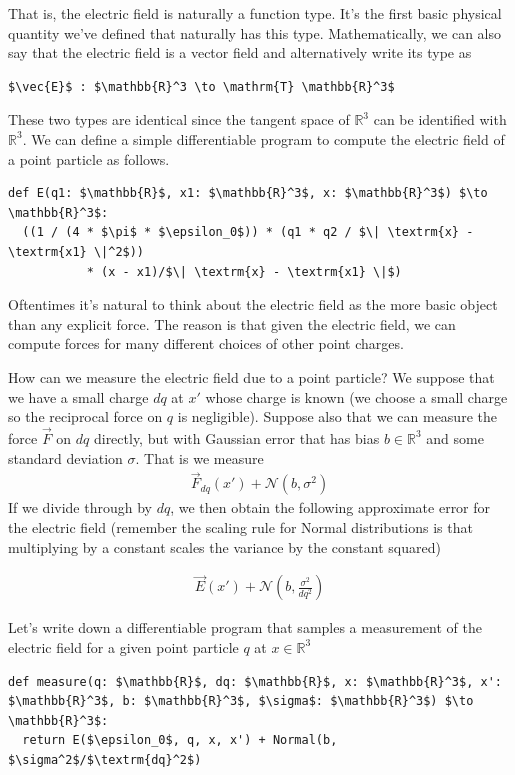\documentclass[book.tex]{subfiles}
\begin{document}
That is, the electric field is naturally a function type. It's the first basic physical quantity we've defined that naturally has this type. Mathematically, we can also say that the electric field is a vector field and alternatively write its type as
\begin{lstlisting}
$\vec{E}$ : $\mathbb{R}^3 \to \mathrm{T} \mathbb{R}^3$
\end{lstlisting}

These two types are identical since the tangent space of $\mathbb{R}^3$ can be identified with $\mathbb{R}^3$. We can define a simple differentiable program to compute the electric field of a point particle as follows.

\begin{lstlisting}
def E(q1: $\mathbb{R}$, x1: $\mathbb{R}^3$, x: $\mathbb{R}^3$) $\to \mathbb{R}^3$:
  ((1 / (4 * $\pi$ * $\epsilon_0$)) * (q1 * q2 / $\| \textrm{x} - \textrm{x1} \|^2$)) 
           * (x - x1)/$\| \textrm{x} - \textrm{x1} \|$)
\end{lstlisting}

Oftentimes it's natural to think about the electric field as the more basic object than any explicit force. The reason is that given the electric field, we can compute forces for many different choices of other point charges.

How can we measure the electric field due to a point particle? We suppose that we have a small charge $dq$ at $x'$ whose charge is known (we choose a small charge so the reciprocal force on $q$ is negligible). Suppose also that we can measure the force $\vec{F}$ on $dq$ directly, but with Gaussian error that has bias $b \in \mathbb{R}^3$ and some standard deviation $\sigma$. That is we measure
\begin{align}
\vec{F}_{dq}(x') + \mathcal{N}(b, \sigma^2)
\end{align}
If we divide through by $dq$, we then obtain the following approximate error for the electric field (remember the scaling rule for Normal distributions is that multiplying by a constant scales the variance by the constant squared)

\begin{align}
    \vec{E}(x') + \mathcal{N}\left (b, \frac{\sigma^2}{dq^2} \right)
\end{align}

Let's write down a differentiable program that samples a measurement of the electric field for a given point particle $q$ at $x \in \mathbb{R}^3$ 

\begin{lstlisting}
def measure(q: $\mathbb{R}$, dq: $\mathbb{R}$, x: $\mathbb{R}^3$, x': $\mathbb{R}^3$, b: $\mathbb{R}^3$, $\sigma$: $\mathbb{R}^3$) $\to \mathbb{R}^3$:
  return E($\epsilon_0$, q, x, x') + Normal(b, $\sigma^2$/$\textrm{dq}^2$)
\end{lstlisting}
\end{document}
